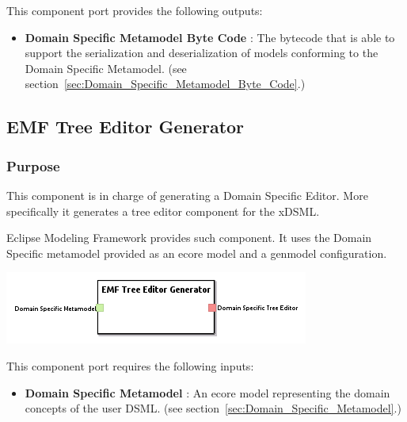 \documentclass{gemoc} %
\begin{document}
This component port provides the following outputs:
\begin{itemize}
  \item \textbf{Domain Specific Metamodel Byte Code} :
The bytecode that is able to support the serialization and deserialization of models conforming to the Domain Specific Metamodel.
(see section~\ref{sec:Domain_Specific_Metamodel_Byte_Code}.)
\end{itemize}


\subsection{EMF Tree Editor Generator}
\label{sec:EMF_Tree_Editor_Generator}


\subsubsection{Purpose}
This component is in charge of generating a Domain Specific Editor. More specifically it generates a tree editor component for the xDSML. 

Eclipse Modeling Framework provides such component. It uses the Domain Specific metamodel provided as an ecore model and a genmodel configuration.

\begin{center}
\includegraphics*[trim=0.0cm 0.0cm 0cm 0.0cm, clip=true]{../images/generated/Generated_EMF_Tree_Editor_Generator.png}
\end{center}

This component port requires the following inputs:
\begin{itemize}
  \item \textbf{Domain Specific Metamodel} :
An ecore model representing the domain concepts of the user DSML.
(see section~\ref{sec:Domain_Specific_Metamodel}.)
\end{itemize}
\end{document}
